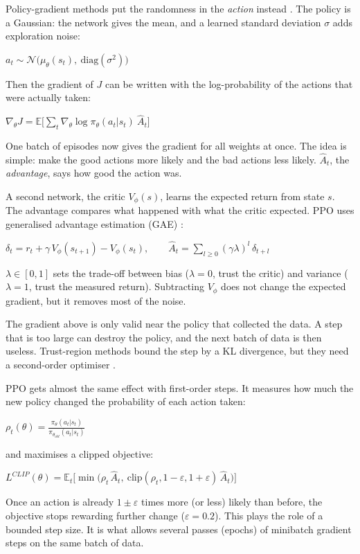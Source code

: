 \documentclass[10pt,a4paper]{article}
\newenvironment{eq}{\vspace{-5pt}\begin{center}$\displaystyle}{$\end{center}\vspace{-6pt}}
\newcommand{\sub}[1]{\vspace{1pt}{\bfseries #1}\par}
\begin{document}
Policy-gradient methods put the randomness in the \emph{action} instead \cite{williams}.
The policy is a Gaussian: the network gives the mean, and a learned standard deviation $\sigma$ adds exploration noise:
\begin{eq}
a_t \sim \mathcal{N}\big(\mu_\theta(s_t),\ \mathrm{diag}(\sigma^2)\big)
\end{eq}
Then the gradient of $J$ can be written with the log-probability of the actions that were actually taken:
\begin{eq}
\nabla_\theta J = \mathbb{E}\Big[\sum_t \nabla_\theta \log \pi_\theta(a_t|s_t)\ \hat A_t\Big]
\end{eq}
One batch of episodes now gives the gradient for all weights at once.
The idea is simple: make the good actions more likely and the bad actions less likely.
$\hat A_t$, the \emph{advantage}, says how good the action was.

\sub{2.3 The critic and the advantage}
A second network, the critic $V_\phi(s)$, learns the expected return from state $s$.
The advantage compares what happened with what the critic expected.
PPO uses generalised advantage estimation (GAE) \cite{gae}:
\begin{eq}
\delta_t = r_t + \gamma\, V_\phi(s_{t+1}) - V_\phi(s_t), \qquad \hat A_t = \sum_{l \ge 0} (\gamma\lambda)^l\, \delta_{t+l}
\end{eq}
$\lambda \in [0,1]$ sets the trade-off between bias ($\lambda=0$, trust the critic) and variance ($\lambda=1$, trust the measured return).
Subtracting $V_\phi$ does not change the expected gradient, but it removes most of the noise.

\sub{2.4 The clipped objective}
The gradient above is only valid near the policy that collected the data.
A step that is too large can destroy the policy, and the next batch of data is then useless.
Trust-region methods bound the step by a KL divergence, but they need a second-order optimiser \cite{trpo}.

PPO gets almost the same effect with first-order steps.
It measures how much the new policy changed the probability of each action taken:
\begin{eq}
\rho_t(\theta) = \frac{\pi_\theta(a_t|s_t)}{\pi_{\theta_{old}}(a_t|s_t)}
\end{eq}
and maximises a clipped objective:
\begin{eq}
L^{CLIP}(\theta) = \mathbb{E}_t\Big[\min\big(\rho_t\, \hat A_t,\ \mathrm{clip}(\rho_t, 1-\varepsilon, 1+\varepsilon)\, \hat A_t\big)\Big]
\end{eq}
Once an action is already $1\pm\varepsilon$ times more (or less) likely than before, the objective stops rewarding further change ($\varepsilon=0.2$).
This plays the role of a bounded step size.
It is what allows several passes (epochs) of minibatch gradient steps on the same batch of data.
\end{document}
